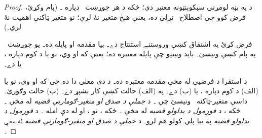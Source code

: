 \documentclass[12pt,a4paper,oneside]{report}
\theoremstyle{definition}
\begin{document}
\label{olpseg:OLP-0083-B007:start}
\begin{proof}
د \LR{${} \Sequent \eq[t][t]$} په بڼه لومړني سېکوېنټونه معتبر دي؛
ځکه د هر جوړښت~ دپاره
۔ (پام وکړئ، فرض کوو چې اصطلاح~ تړلې ده،
يعنې هېڅ متغير نۀ لري؛ نو متغير-ټاکنې اهميت نۀ لري۔)
\label{olpseg:OLP-0083-B007:end}

\label{olpseg:OLP-0083-B008:start}
فرض کړئ په اشتقاق کښې وروستنے استنتاج \LR{$=$} دے۔ بيا مقدمه
 او پايله
 ده۔ يو
جوړښت~ په پام کښې ونيسئ۔ بايد وښيو چې پايله
معتبره ده؛ يعنې که  او
 وي، نو يا د کوم  دپاره
، يا  دے۔
\label{olpseg:OLP-0083-B008:end}

\label{olpseg:OLP-0083-B009:start}
د استقرا د فرضيې له مخې مقدمه معتبره ده۔ د دې معنٰی دا ده چې که
 او  وي، نو يا
(الف) د کوم  دپاره ، يا
(ب)  دے۔ په (الف) حالت کښې کار بشپړ دے۔ (ب)
حالت وګورئ۔ داسې متغير-ټاکنه~ ونيسئ چې
۔ د
\emph{جملې د صدق او متغير-ګومارنې قضيه}\nobreakspace{} له مخې
۔ ځکه ، د
\emph{فورمول د بدلولو قضيه}\nobreakspace{} له مخې
۔ ځکه ، نو
، او له دې امله
۔ د
\emph{فورمول د بدلولو قضيه}\nobreakspace{} په بيا پلي کولو
 هم لرو۔ د
\emph{جملې د صدق او متغير-ګومارنې قضيه}\nobreakspace{} له مخې
۔
\end{proof}
\label{olpseg:OLP-0083-B009:end}
\end{document}

